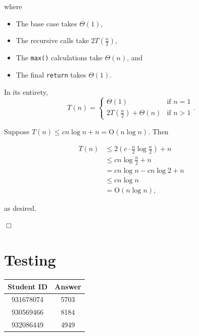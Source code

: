 \documentclass[a4paper,10pt]{article}
\begin{document}
		where

		\begin{itemize}
		\item The base case takes $\Theta(1)$,
		\item The recursive calls take $2T\left(\frac{n}{2}\right)$,
		\item The {\tt max()} calculations take $\Theta(n)$, and
		\item The final {\tt return} takes $\Theta(1)$.
		\end{itemize}

		In its entirety, \[T(n) = \begin{cases} \Theta(1) &\mbox{if } n = 1 \\ 2T\left(\frac{n}{2}\right) + \Theta(n) &\mbox{if } n > 1 \end{cases}.\]

		Suppose $T(n) \leq cn \log n + n = \text{O}(n \log n)$. Then


		\begin{align*}
		T(n) &\leq 2\left(c \cdot \frac{n}{2} \log \frac{n}{2}\right) + n \\
		     &\leq cn \log \frac{n}{2} + n \\
		     &= cn \log n - cn \log 2 + n \\
		     &\leq cn \log n \\
		     &= \text{O}(n \log n),
		\end{align*}

		as desired.

		\begin{center}
		$\Box$
		\end{center}


	\section{Testing}

		\begin{tabular}{ | c | c | }
		\hline
		Student ID & Answer\\ \hline
		931678074 & 5703 \\
		930569466 & 8184 \\
		932086449 & 4949 \\
		\hline
		\end{tabular}
\end{document}
